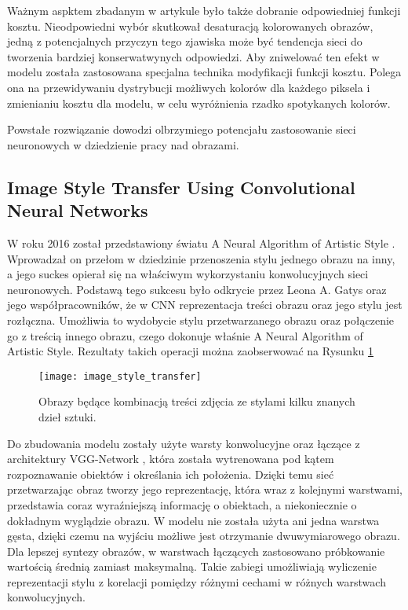     Ważnym aspktem zbadanym w artykule było także dobranie odpowiedniej
    funkcji kosztu. Nieodpowiedni wybór skutkował desaturacją kolorowanych
    obrazów, jedną z potencjalnych przyczyn tego zjawiska może być tendencja
    sieci do tworzenia bardziej konserwatwynych odpowiedzi. Aby zniwelować ten
    efekt w modelu została zastosowana specjalna technika modyfikacji
    funkcji kosztu. Polega ona na przewidywaniu dystrybucji możliwych kolorów
    dla każdego piksela i zmienianiu kosztu dla modelu, w celu wyróżnienia rzadko
    spotykanych kolorów.

    Powstałe rozwiązanie dowodzi olbrzymiego potencjału zastosowanie sieci
    neuronowych w dziedzienie pracy nad obrazami.

  \subsection{Image Style Transfer Using Convolutional Neural Networks}
    W roku 2016 został przedstawiony światu A Neural Algorithm of Artistic Style
    \cite{image_style_transfer}. Wprowadzał on przełom w dziedzinie przenoszenia
    stylu jednego obrazu na inny, a jego suckes opierał się na właściwym wykorzystaniu
    konwolucyjnych sieci neuronowych. Podstawą tego sukcesu było odkrycie przez
    Leona A. Gatys oraz jego współpracowników, że w CNN reprezentacja treści
    obrazu oraz jego stylu jest rozłączna. Umożliwia to wydobycie stylu
    przetwarzanego obrazu oraz połączenie go z treścią innego obrazu, czego
    dokonuje właśnie A Neural Algorithm of Artistic Style. Rezultaty takich
    operacji można zaobserwować na Rysunku \ref{fig:image_style_transfer}

    \begin{figure}[ht]
      \centering
      \texttt{[image: image\_style\_transfer]}
      \caption{Obrazy będące kombinacją treści zdjęcia ze stylami kilku znanych dzieł sztuki.}
      \label{fig:image_style_transfer}
    \end{figure}

    Do zbudowania modelu zostały użyte warsty konwolucyjne oraz łączące z
    architektury VGG-Network \cite{vgg_network}, która została wytrenowana pod
    kątem rozpoznawanie obiektów i określania ich położenia. Dzięki temu sieć
    przetwarzając obraz tworzy jego reprezentację, która wraz z
    kolejnymi warstwami, przedstawia coraz wyraźniejszą informację o obiektach,
    a niekoniecznie o dokładnym wyglądzie obrazu.
    W modelu nie została użyta ani jedna warstwa gęsta, dzięki czemu na wyjściu
    możliwe jest otrzymanie dwuwymiarowego obrazu.
    Dla lepszej syntezy obrazów, w warstwach
    łączących zastosowano próbkowanie wartością średnią zamiast maksymalną.
    Takie zabiegi umożliwiają wyliczenie reprezentacji stylu z korelacji
    pomiędzy różnymi cechami w różnych warstwach konwolucyjnych.

